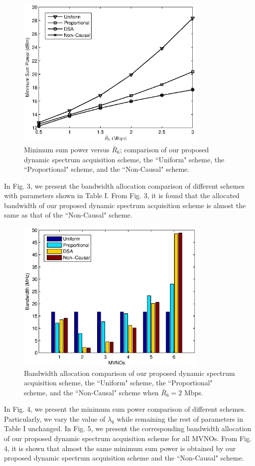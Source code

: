 \documentclass[journal]{IEEEtran}
\begin{document}
\begin{figure}
\centering
\includegraphics[width=3.6in]{fig2.eps}
\caption{Minimum sum power versus $\bar{R}_6$; comparison of our proposed dynamic spectrum acquisition scheme, the ``Uniform" scheme, the ``Proportional" scheme, and the ``Non-Causal" scheme.}
\end{figure}

In Fig. 3, we present the bandwidth allocation comparison of different schemes{
\color{red}	with parameters shown in Table I}. From Fig. 3, it is found that the allocated bandwidth of our proposed dynamic spectrum acquisition scheme is almost the same as that of the ``Non-Causal" scheme.

\begin{figure}
\centering
\includegraphics[width=3.6in]{fig3.eps}
\caption{Bandwidth allocation comparison of our proposed dynamic spectrum acquisition scheme, the ``Uniform" scheme, the ``Proportional" scheme, and the ``Non-Causal" scheme when $\bar{R}_6=2$ Mbps.}
\end{figure}

In Fig. 4, we present the minimum sum power comparison of different schemes. {\color{red} Particularly, we vary the value of $\lambda_6$ while remaining the rest of parameters in Table I unchanged}. In Fig. 5, we present the corresponding bandwidth allocation of our proposed dynamic spectrum acquisition scheme for all MVNOs. From Fig. 4, it is shown that almost the same minimum sum power is obtained by our proposed dynamic spectrum acquisition scheme and the ``Non-Causal" scheme.
\end{document}
